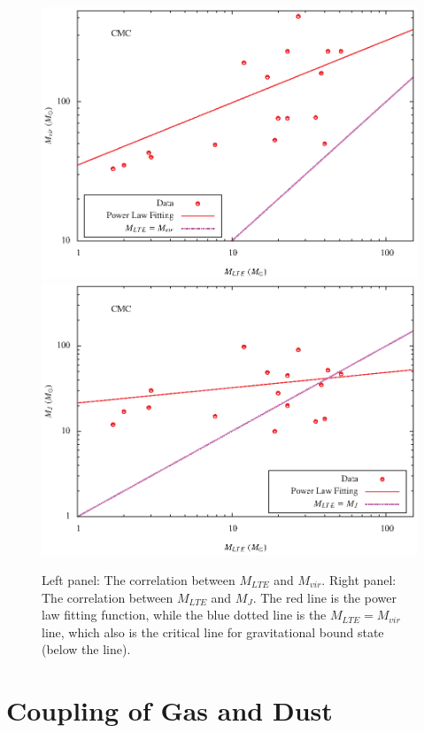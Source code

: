 \documentclass{article}
\begin{document}
\begin{figure}[h]
\includegraphics[totalheight=40mm]{M_vir_cmc.eps}
\includegraphics[totalheight=40mm]{M_j_cmc.eps}

{Left panel: The correlation between $M_{LTE}$ and $M_{vir}$. Right panel: The correlation between $M_{LTE}$ and $M_{J}$. The red line is the power law fitting function, while the blue dotted line is the $M_{LTE}=M_{vir}$line, which also is the critical line for gravitational bound state (below the line).}
\end{figure}
\newpage

\section{Coupling of Gas and Dust}
\end{document}
